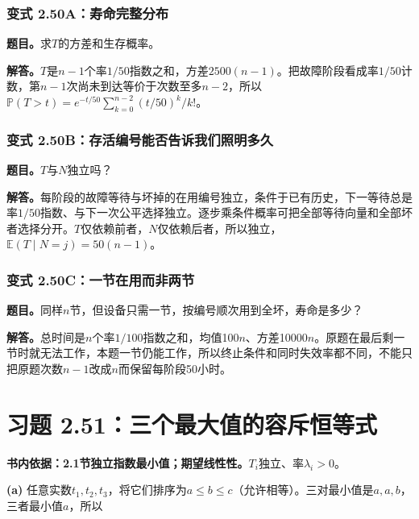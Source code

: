 \documentclass[12pt,a4paper,UTF8,fontset=fandol]{ctexart}
\begin{document}
\subsubsection{变式
2.50A：寿命完整分布}\label{ux53d8ux5f0f-2.50aux5bffux547dux5b8cux6574ux5206ux5e03}

\textbf{题目。}求\(T\)的方差和生存概率。

\textbf{解答。}\(T\)是\(n-1\)个率\(1/50\)指数之和，方差\(2500(n-1)\)。把故障阶段看成率\(1/50\)计数，第\(n-1\)次尚未到达等价于次数至多\(n-2\)，所以\(\mathbb P(T>t)=e^{-t/50}\sum_{k=0}^{n-2}(t/50)^k/k!\)。

\subsubsection{变式
2.50B：存活编号能否告诉我们照明多久}\label{ux53d8ux5f0f-2.50bux5b58ux6d3bux7f16ux53f7ux80fdux5426ux544aux8bc9ux6211ux4eecux7167ux660eux591aux4e45}

\textbf{题目。}\(T\)与\(N\)独立吗？

\textbf{解答。}每阶段的故障等待与坏掉的在用编号独立，条件于已有历史，下一等待总是率\(1/50\)指数、与下一次公平选择独立。逐步乘条件概率可把全部等待向量和全部坏者选择分开。\(T\)仅依赖前者，\(N\)仅依赖后者，所以独立，\(\mathbb E(T\mid N=j)=50(n-1)\)。

\subsubsection{变式
2.50C：一节在用而非两节}\label{ux53d8ux5f0f-2.50cux4e00ux8282ux5728ux7528ux800cux975eux4e24ux8282}

\textbf{题目。}同样\(n\)节，但设备只需一节，按编号顺次用到全坏，寿命是多少？

\textbf{解答。}总时间是\(n\)个率\(1/100\)指数之和，均值100\(n\)、方差10000\(n\)。原题在最后剩一节时就无法工作，本题一节仍能工作，所以终止条件和同时失效率都不同，不能只把原题次数\(n-1\)改成\(n\)而保留每阶段50小时。

\section{习题
2.51：三个最大值的容斥恒等式}\label{ux4e60ux9898-2.51ux4e09ux4e2aux6700ux5927ux503cux7684ux5bb9ux65a5ux6052ux7b49ux5f0f}

\textbf{书内依据：2.1节独立指数最小值；期望线性性。}\(T_i\)独立、率\(\lambda_i>0\)。

\textbf{(a)}
任意实数\(t_1,t_2,t_3\)，将它们排序为\(a\le b\le c\)（允许相等）。三对最小值是\(a,a,b\)，三者最小值\(a\)，所以
\end{document}
